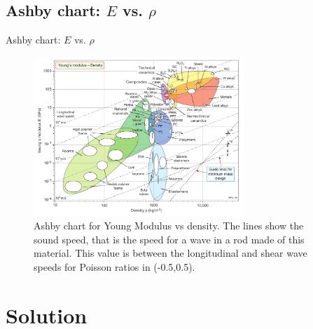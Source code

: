 \documentclass{beamer}
\begin{document}
\subsection{Ashby chart: $E$ vs. $\rho$}
\begin{frame}{Ashby chart: $E$ vs. $\rho$}
\begin{figure}
\includegraphics[height=6cm]{img/E_vs_density-vector.pdf} 
\caption{Ashby chart for Young Modulus vs density. The lines show the sound speed, that is the speed for a wave in a rod made of this
material.  This value is between the longitudinal and shear wave speeds for Poisson ratios in (-0.5,0.5). \cite{ashby2005}}
\end{figure}
\end{frame}

\section{Solution}
\end{document}
